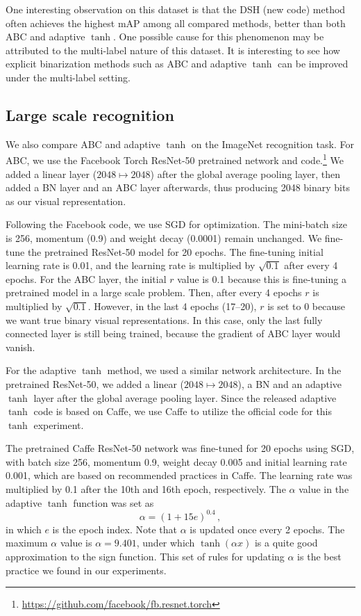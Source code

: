 \documentclass[runningheads]{llncs}
\begin{document}
One interesting observation on this dataset is that the DSH (new code) method often achieves the highest mAP among all compared methods, better than both ABC and adaptive $\tanh$. One possible cause for this phenomenon may be attributed to the multi-label nature of this dataset. It is interesting to see how explicit binarization methods such as ABC and adaptive $\tanh$ can be improved under the multi-label setting.

\subsection{Large scale recognition} \label{sec:exp:imagenet}

We also compare ABC and adaptive $\tanh$ on the ImageNet recognition task. For ABC, we use the Facebook Torch ResNet-50 pretrained network and code.\footnote{\url{https://github.com/facebook/fb.resnet.torch}} We added a linear layer ($2048 \mapsto 2048$) after the global average pooling layer, then added a BN layer and an ABC layer afterwards, thus producing 2048 binary bits as our visual representation.

Following the Facebook code, we use SGD for optimization. The mini-batch size is 256, momentum (0.9) and weight decay (0.0001) remain unchanged. We fine-tune the pretrained ResNet-50 model for 20 epochs. The fine-tuning initial learning rate is 0.01, and the learning rate is multiplied by $\sqrt{0.1}$ after every 4 epochs. For the ABC layer, the initial $r$ value is 0.1 because this is fine-tuning a pretrained model in a large scale problem. Then, after every 4 epochs $r$ is multiplied by $\sqrt{0.1}$. However, in the last 4 epochs (17--20), $r$ is set to 0 because we want true binary visual representations. In this case, only the last fully connected layer is still being trained, because the gradient of ABC layer would vanish.

For the adaptive $\tanh$ method, we used a similar network architecture. In the pretrained ResNet-50, we added a linear ($2048 \mapsto 2048$), a BN and an adaptive $\tanh$ layer after the global average pooling layer. Since the released adaptive $\tanh$ code is based on Caffe, we use Caffe to utilize the official code for this $\tanh$ experiment.

The pretrained Caffe ResNet-50 network was fine-tuned for 20 epochs using SGD, with batch size 256, momentum 0.9, weight decay 0.005 and initial learning rate 0.001, which are based on recommended practices in Caffe. The learning rate was multiplied by 0.1 after the 10th and 16th epoch, respectively. The $\alpha$ value in the adaptive $\tanh$ function was set as $$\alpha = (1+15e)^{0.4} \,,$$ in which $e$ is the epoch index. Note that $\alpha$ is updated once every 2 epochs. The maximum $\alpha$ value is $\alpha=9.401$, under which $\tanh(\alpha x)$ is a quite good approximation to the sign function. This set of rules for updating $\alpha$ is the best practice we found in our experiments.
\end{document}
